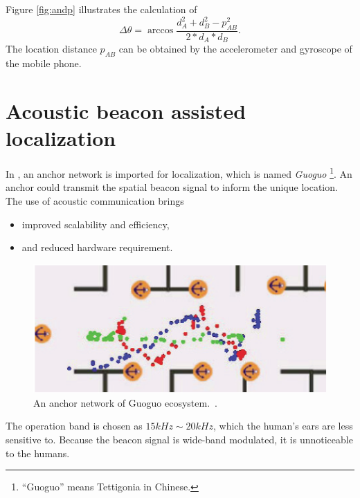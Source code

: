 \documentclass[letterpaper]{article}
\begin{document}
Figure \ref{fig:andp} illustrates the calculation of
\begin{equation}
\Delta \theta = \arccos \frac{ d_{A}^{2}+d_{B}^{2}-p_{AB}^{2} }{ 2 * d_{A} * d_{B} }.
\end{equation}
The location distance $ p_{AB} $ can be obtained by the accelerometer and gyroscope of the mobile phone.

\section{Acoustic beacon assisted localization}

In \cite{Liu:2013:GEF:2462456.2464450}, an anchor network is imported for localization, which is named \emph{Guoguo}
\footnote{``Guoguo'' means Tettigonia in Chinese.}.
An anchor could transmit the spatial beacon signal to inform the unique location.
The use of acoustic communication brings
\begin{itemize}
	\item improved scalability and efficiency,
	\item and reduced hardware requirement.
\end{itemize}
\begin{figure}
	\centering
	\includegraphics[width=0.9\linewidth]{fig/GUOGUO.png}
	\caption{An anchor network of Guoguo ecosystem.~\cite{Liu:2013:GEF:2462456.2464450}.}
	\label{fig:guoguo}
\end{figure}
The operation band is chosen as $ 15 kHz \sim 20 kHz $, which the human's ears are less sensitive to.
Because the beacon signal is wide-band modulated, it is unnoticeable to the humans.
\end{document}
